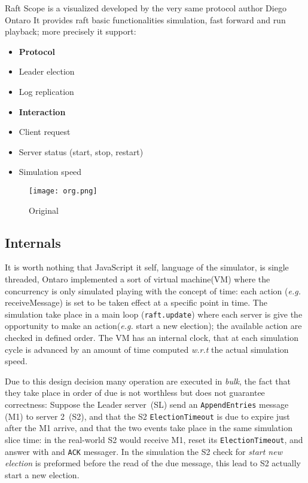 Raft Scope is a visualized developed by the very same protocol author
Diego Ontaro%
It provides raft basic functionalities simulation, fast forward and run playback;
more precisely it support:
\begin{itemize}
    \item[] \textbf{Protocol}
        \item Leader election
        \item Log replication
    \item[] \textbf{Interaction}
        \item Client request
        \item Server status (start, stop, restart)
        \item Simulation speed
\end{itemize}

\begin{figure}[h]
    \centering
    \texttt{[image: org.png]}
    \caption{Original}\label{fig:original}
\end{figure}

\subsection{Internals}
It is worth nothing that JavaScript it self, language of the simulator,
is single threaded, Ontaro implemented a sort of virtual machine(VM) where the
concurrency is only simulated playing with the concept of time: each action
(\textit{e.g.} receiveMessage) is set to be taken effect at a specific point
in time.
The simulation take place in a main loop (\texttt{raft.update}) where each
server is give the opportunity to make an action(\emph{e.g.} start a new election);
the available action are checked in defined order.
The VM has an internal clock, that at each simulation cycle is
advanced by an amount of time computed \textit{w.r.t} the actual simulation speed.

Due to this design decision many operation are executed in \emph{bulk}, the fact
that they take place in order of due is not worthless but does not guarantee
correctness: Suppose the Leader server~(SL) send an \texttt{AppendEntries} message (M1)
to server 2~(S2), and that the S2 \texttt{ElectionTimeout} is due to expire just after
the M1 arrive, and that the two events take place in the same simulation slice time:
in the real-world S2 would receive M1, reset its \texttt{ElectionTimeout},
and answer with and \texttt{ACK} messager. In the simulation the S2 check for
\emph{start new election} is preformed before the read of the due message,
this lead to S2 actually start a new election.

